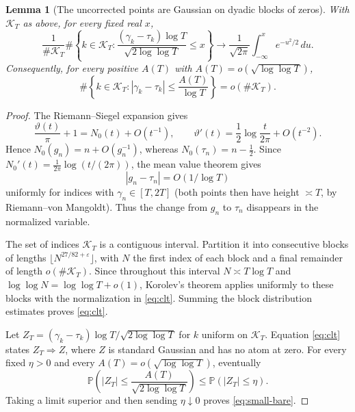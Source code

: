 \documentclass[11pt,a4paper]{article}
\newtheorem{lemma}{Lemma}
\newcommand{\KK}{\mathcal K_T}
\newcommand{\Nzero}{N_0}
\begin{document}
\begin{lemma}[The uncorrected points are Gaussian on dyadic blocks of zeros]\label{lem:clt}
With $\KK$ as above, for every fixed real $x$,
\begin{equation}
\frac1{\#\KK}\#\left\{k\in\KK:
\frac{(\gamma_k-\tau_k)\log T}{\sqrt{2\log\log T}}\le x\right\}
\longrightarrow \frac1{\sqrt{2\pi}}\int_{-\infty}^x e^{-u^2/2}\,du.
\label{eq:clt}
\end{equation}
Consequently, for every positive $A(T)$ with
$A(T)=o(\sqrt{\log\log T})$,
\begin{equation}
\#\left\{k\in\KK:|\gamma_k-\tau_k|\le\frac{A(T)}{\log T}\right\}
=o(\#\KK).
\label{eq:small-bare}
\end{equation}
\end{lemma}

\begin{proof}
The Riemann--Siegel expansion gives
\[
\frac{\vartheta(t)}{\pi}+1=\Nzero(t)+O(t^{-1}),\qquad
\vartheta'(t)=\frac12\log\frac{t}{2\pi}+O(t^{-2}).
\]
Hence $\Nzero(g_n)=n+O(g_n^{-1})$, whereas
$\Nzero(\tau_n)=n-\frac12$. Since
$\Nzero'(t)=\frac1{2\pi}\log(t/(2\pi))$, the mean value theorem gives
\begin{equation}
|g_n-\tau_n|=O(1/\log T)
\label{eq:gram-shift}
\end{equation}
uniformly for indices with $\gamma_n\in[T,2T]$ (both points then have height $\asymp T$, by Riemann--von Mangoldt). Thus the change from $g_n$ to $\tau_n$ disappears in the normalized variable.

The set of indices $\KK$ is a contiguous interval. Partition it into consecutive blocks of lengths $\lfloor N^{27/82+\varepsilon}\rfloor$, with $N$ the first index of each block and a final remainder of length $o(\#\KK)$. Since throughout this interval $N\asymp T\log T$ and $\log\log N=\log\log T+o(1)$, Korolev's theorem applies uniformly to these blocks with the normalization in \eqref{eq:clt}. Summing the block distribution estimates proves \eqref{eq:clt}.

Let $Z_T=(\gamma_k-\tau_k)\log T/\sqrt{2\log\log T}$ for $k$ uniform on $\KK$. Equation \eqref{eq:clt} states $Z_T\Rightarrow Z$, where $Z$ is standard Gaussian and has no atom at zero. For every fixed $\eta>0$ and every $A(T)=o(\sqrt{\log\log T})$, eventually
\[
\mathbb P\left(|Z_T|\le \frac{A(T)}{\sqrt{2\log\log T}}\right)
\le\mathbb P(|Z_T|\le\eta).
\]
Taking a limit superior and then sending $\eta\downarrow0$ proves \eqref{eq:small-bare}.
\end{proof}
\end{document}
